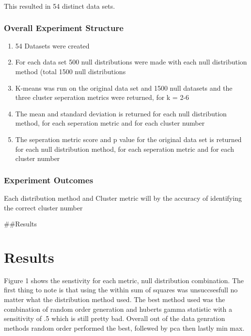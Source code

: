 \documentclass[
]{article}
\providecommand{\tightlist}{%
  \setlength{\itemsep}{0pt}\setlength{\parskip}{0pt}}
\begin{document}
This resulted in 54 distinct data sets.

\hypertarget{overall-experiment-structure}{%
\subsubsection{Overall Experiment
Structure}\label{overall-experiment-structure}}

\begin{enumerate}
\def\labelenumi{\arabic{enumi}.}
\tightlist
\item
  54 Datasets were created
\item
  For each data set 500 null distributions were made with each null
  distribution method (total 1500 null distributions
\item
  K-means was run on the original data set and 1500 null datasets and
  the three cluster seperation metrics were returned, for k = 2-6
\item
  The mean and standard deviation is returned for each null distribution
  method, for each seperation metric and for each cluster number
\item
  The seperation metric score and p value for the original data set is
  returned for each null distribution method, for each seperation metric
  and for each cluster number
\end{enumerate}

\hypertarget{experiment-outcomes}{%
\subsubsection{Experiment Outcomes}\label{experiment-outcomes}}

Each distribution method and Cluster metric will by the accuracy of
identifying the correct cluster number

\#\#Results

\hypertarget{results}{%
\section{Results}\label{results}}

Figure 1 shows the senstivity for each metric, null distribution
combination. The first thing to note is that using the within sum of
squares was unsuccsesfull no matter what the distribution method used.
The best method used was the combination of random order generation and
huberts gamma statistic with a sensitivity of .5 which is still pretty
bad. Overall out of the data genration methods random order performed
the best, follewed by pca then lastly min max.
\end{document}
